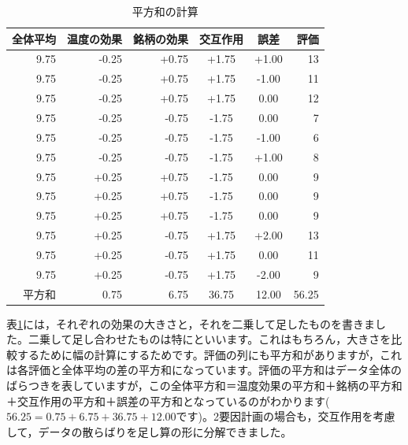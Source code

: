 \documentclass{ltjbook}
\begin{document}
\begin{table}[ht]
  \centering
  \caption{平方和の計算} 
  \begin{tabular}{rrrccr}
    \hline
  全体平均 & 温度の効果 & 銘柄の効果 & 交互作用 & 誤差 & 評価 \\ 
    \hline
  9.75 & -0.25 & +0.75 &  +1.75 & +1.00 & 13 \\ 
  9.75 & -0.25 & +0.75 & +1.75& -1.00 & 11 \\ 
  9.75 & -0.25 & +0.75 & +1.75& 0.00 & 12 \\ \hline
  9.75 & -0.25 & -0.75 &-1.75 & 0.00 & 7 \\ 
  9.75 & -0.25 & -0.75 & -1.75& -1.00& 6\\ 
  9.75 & -0.25 & -0.75 & -1.75 & +1.00& 8 \\ \hline
  9.75 & +0.25 & +0.75 & -1.75 & 0.00 & 9 \\ 
  9.75 & +0.25 & +0.75 & -1.75& 0.00& 9 \\ 
  9.75 & +0.25 & +0.75 & -1.75 & 0.00& 9 \\ \hline
  9.75 & +0.25 & -0.75 & +1.75 & +2.00 & 13 \\ 
  9.75 & +0.25 & -0.75 & +1.75 & 0.00& 11 \\ 
  9.75 & +0.25 & -0.75 & +1.75 & -2.00& 9 \\ 
     \hline\hline
平方和 & 0.75 & 6.75 & 36.75 & 12.00 &  56.25\\\hline
  \end{tabular}
  \label{tbl::13_04}
\end{table}
表\ref{tbl::13_04}には，それぞれの効果の大きさと，それを二乗して足したものを書きました。二乗して足し合わせたものは特にといいます。これはもちろん，大きさを比較するために幅の計算にするためです。評価の列にも平方和がありますが，これは各評価と全体平均の差の平方和になっています。評価の平方和はデータ全体のばらつきを表していますが，この全体平方和＝温度効果の平方和＋銘柄の平方和＋交互作用の平方和＋誤差の平方和となっているのがわかります($56.25=0.75+6.75+36.75+12.00$です)。2要因計画の場合も，交互作用を考慮して，データの散らばりを足し算の形に分解できました。
\end{document}

